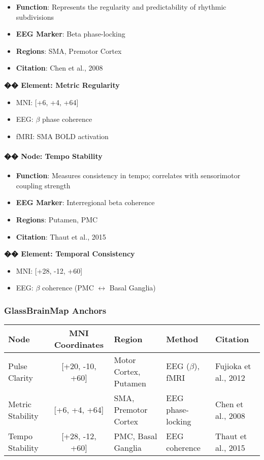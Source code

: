 \begin{itemize}
    \item \textbf{Function}: Represents the regularity and predictability of rhythmic subdivisions
    \item \textbf{EEG Marker}: Beta phase-locking
    \item \textbf{Regions}: SMA, Premotor Cortex
    \item \textbf{Citation}: Chen et al., 2008
\end{itemize}

\textbf{�� Element: Metric Regularity}

\begin{itemize}
    \item MNI: [+6, +4, +64]
    \item EEG: $\beta$ phase coherence
    \item fMRI: SMA BOLD activation
\end{itemize}

\paragraph{�� Node: Tempo Stability}

\begin{itemize}
    \item \textbf{Function}: Measures consistency in tempo; correlates with sensorimotor coupling strength
    \item \textbf{EEG Marker}: Interregional beta coherence
    \item \textbf{Regions}: Putamen, PMC
    \item \textbf{Citation}: Thaut et al., 2015
\end{itemize}

\textbf{�� Element: Temporal Consistency}

\begin{itemize}
    \item MNI: [+28, -12, +60]
    \item EEG: $\beta$ coherence (PMC $\leftrightarrow$ Basal Ganglia)
\end{itemize}

\subsubsection*{GlassBrainMap Anchors}

\begin{center}
\begin{tabular}{|l|c|l|l|l|}
\hline
\textbf{Node} & \textbf{MNI Coordinates} & \textbf{Region} & \textbf{Method} & \textbf{Citation} \\
\hline
Pulse Clarity & [+20, -10, +60] & Motor Cortex, Putamen & EEG ($\beta$), fMRI & Fujioka et al., 2012 \\
Metric Stability & [+6, +4, +64] & SMA, Premotor Cortex & EEG phase-locking & Chen et al., 2008 \\
Tempo Stability & [+28, -12, +60] & PMC, Basal Ganglia & EEG coherence & Thaut et al., 2015 \\
\hline
\end{tabular}
\end{center}


